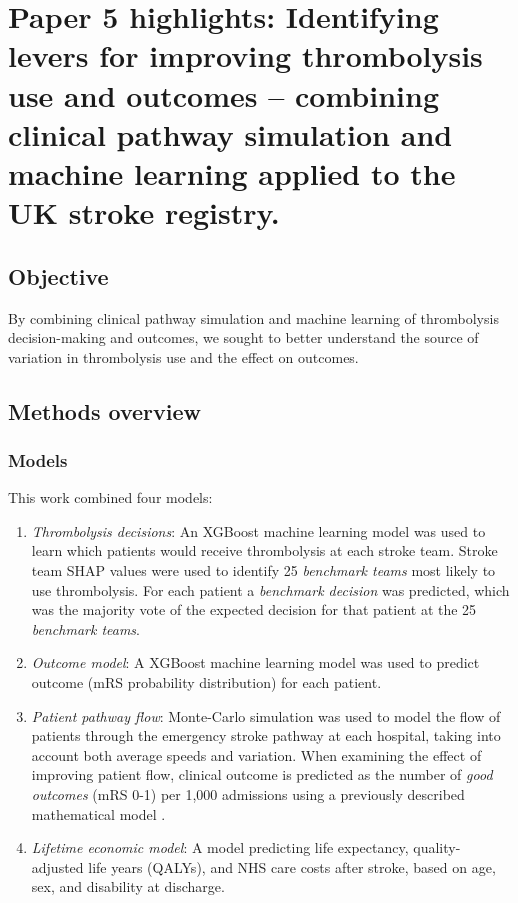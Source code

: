 \section{Paper 5 highlights: Identifying levers for improving thrombolysis use and outcomes – combining clinical pathway simulation and machine learning applied to the UK stroke registry.\cite{pearn_identifying_2024}} \label{sec:paper_5}

\subsection{Objective}

By combining clinical pathway simulation and machine learning of thrombolysis decision-making and outcomes, we sought to better understand the source of variation in thrombolysis use and the effect on outcomes.

\subsection{Methods overview}

\subsubsection{Models}

This work combined four models:

\begin{enumerate}

    \item \textit{Thrombolysis decisions}: An XGBoost machine learning model \cite{chen_xgboost_2016} was used to learn which patients would receive thrombolysis at each stroke team. Stroke team SHAP values were used to identify 25 \textit{benchmark teams} most likely to use thrombolysis. For each patient a \textit{benchmark decision} was predicted, which was the majority vote of the expected decision for that patient at the 25 \textit{benchmark teams}.

    \item \textit{Outcome model}: A XGBoost machine learning model was used to predict outcome (mRS probability distribution) for each patient.

    \item \textit{Patient pathway flow}: Monte-Carlo simulation was used to model the flow of patients through the emergency stroke pathway at each hospital, taking into account both average speeds and variation. When examining the effect of improving patient flow, clinical outcome is predicted as the number of \textit{good outcomes} (mRS 0-1) per 1,000 admissions using a previously described mathematical model \cite{allen_estimation_2020}.

    \item \textit{Lifetime economic model}: A model predicting life expectancy, quality-adjusted life years (QALYs), and NHS care costs after stroke, based on age, sex, and disability at discharge\cite{mcmeekin_lifetime_2024}.
    
\end{enumerate}

